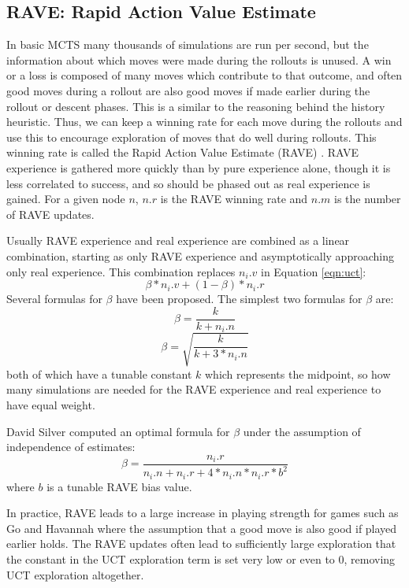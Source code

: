 \subsection{RAVE: Rapid Action Value Estimate}\label{sec:rave}

In basic MCTS many thousands of simulations are run per second, but the information about which moves were made during the rollouts is unused. A win or a loss is composed of many moves which contribute to that outcome, and often good moves during a rollout are also good moves if made earlier during the rollout or descent phases. This is a similar to the reasoning behind the history heuristic. Thus, we can keep a winning rate for each move during the rollouts and use this to encourage exploration of moves that do well during rollouts. This winning rate is called the Rapid Action Value Estimate (RAVE) \cite{gelly2007rave}. RAVE experience is gathered more quickly than by pure experience alone, though it is less correlated to success, and so should be phased out as real experience is gained. For a given node $n$,  $n.r$ is the RAVE winning rate and $n.m$ is the number of RAVE updates.

Usually RAVE experience and real experience are combined as a linear combination, starting as only RAVE experience and asymptotically approaching only real experience. This combination replaces $n_i.v$ in Equation \ref{eqn:uct}:
\begin{equation}\label{eqn:rave1} \beta*n_i.v + (1-\beta)*n_i.r \end{equation}
Several formulas for $\beta$ have been proposed. The simplest two formulas for $\beta$ are:
\begin{equation}\label{eqn:rave2} \beta = \frac{k}{k+n_i.n} \end{equation}
\begin{equation}\label{eqn:rave3} \beta = \sqrt{\frac{k}{k+3*n_i.n}} \end{equation}
 both of which have a tunable constant $k$ which represents the midpoint, so how many simulations are needed for the RAVE experience and real experience to have equal weight.

David Silver computed an optimal formula for $\beta$ under the assumption of independence of estimates:
\begin{equation}\label{eqn:rave4} \beta = \frac{n_i.r}{n_i.n+n_i.r+4*n_i.n*n_i.r*b^2} \end{equation}
where $b$ is a tunable RAVE bias value.

In practice, RAVE leads to a large increase in playing strength for games such as Go and Havannah where the assumption that a good move is also good if played earlier holds. The RAVE updates often lead to sufficiently large exploration that the constant in the UCT exploration term is set very low or even to 0, removing UCT exploration altogether.

